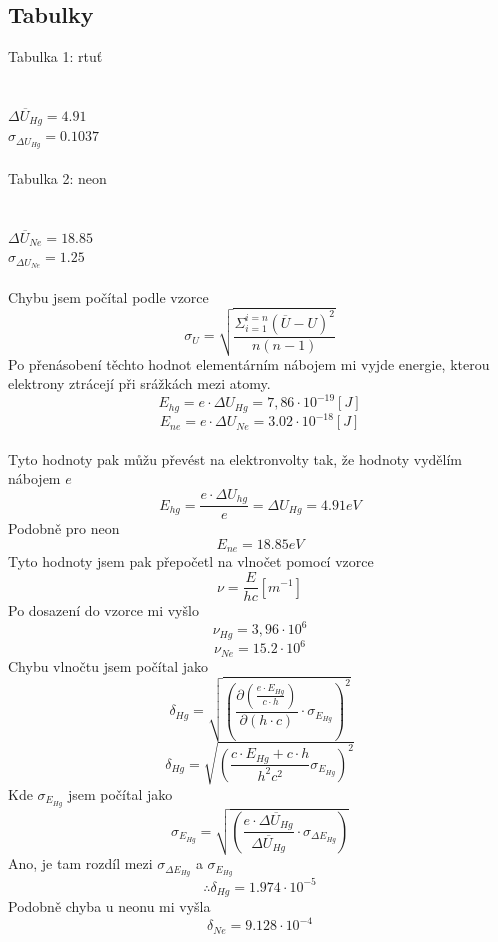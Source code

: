 \documentclass{article}
\begin{document}
\subsection{Tabulky}
\footnotesize{Tabulka 1: rtuť}\\
\\
\vspace{1em}
\\
$\overline{\Delta U_{Hg}} = 4.91$\\
$\sigma_{\Delta U}_{Hg} = 0.1037$
\\
\vspace{1em}
\\
\footnotesize{Tabulka 2: neon}\\
\\
\vspace{1em}
\\
$\overline{\Delta U_{Ne}} = 18.85$\\
$\sigma_{\Delta U}_{Ne} = 1.25$
\\
\vspace{1em}
\\
Chybu jsem počítal podle vzorce
$$\sigma_{U} = \sqrt{\frac{ \Sigma_{i=1}^{i=n}(\overline{U}-U)^{2} }{n(n-1)} }$$
\vspace{2em}
Po přenásobení těchto hodnot elementárním nábojem mi vyjde energie, kterou elektrony ztrácejí při srážkách mezi atomy.
$$E_{hg} = e \cdot \Delta U_{Hg} = 7,86 \cdot 10^{-19} [J]$$
$$E_{ne} = e \cdot \Delta U_{Ne} = 3.02 \cdot 10^{-18} [J]$$
\\
Tyto hodnoty pak můžu převést na elektronvolty tak, že hodnoty vydělím nábojem $e$
$$E_{hg} = \frac{e \cdot \Delta U_{hg}}{e} = \Delta U_{Hg} = 4.91 eV$$
Podobně pro neon
$$E_{ne} = 18.85 eV$$
Tyto hodnoty jsem pak přepočetl na vlnočet pomocí vzorce
$$\nu = \frac{E}{hc} [m^{-1}]$$
Po dosazení do vzorce mi vyšlo
$$\nu_{Hg} = 3,96 \cdot 10^{6}$$
$$\nu_{Ne} = 15.2 \cdot 10^{6}$$
\newpage
Chybu vlnočtu jsem počítal jako
$$\delta_{Hg} = \sqrt{ \left(  \frac{ \partial \left( \frac{e \cdot E_{Hg}}{c \cdot h} \right) }{ \partial (h \cdot c) } \cdot \sigma_{E}_{Hg}  \right)^{2} }$$
$$\delta_{Hg} = \sqrt{ \left( \frac{c \cdot E_{Hg} + c \cdot h}{h^{2} c^{2}} \sigma_{E}_{Hg} \right)^{2} }$$
Kde $\sigma_{E}_{Hg}$ jsem počítal jako
$$\sigma_{E}_{Hg} = \sqrt{ \left( \frac{e \cdot \overline{\Delta U_{Hg}}}{\overline{\Delta U_{Hg}}} \cdot \sigma_{\Delta E}_{Hg} \right) }$$
Ano, je tam rozdíl mezi $\sigma_{\Delta E}_{Hg}$ a $\sigma_{E}_{Hg}$
$$\therefore \delta_{Hg} = 1.974 \cdot 10^{-5}$$
Podobně chyba u neonu mi vyšla
$$\delta_{Ne} = 9.128 \cdot 10^{-4}$$
\end{document}
